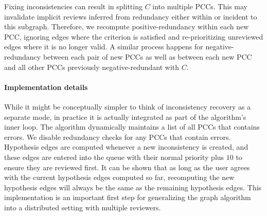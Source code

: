 Fixing inconsistencies can result in splitting $C$ into multiple PCCs.
This may invalidate implicit reviews inferred from redundancy either within or incident to this subgraph.
Therefore, we recompute positive-redundancy within each new PCC, ignoring edges where the criterion is satisfied
  and re-prioritizing unreviewed edges where it is no longer valid.
A similar process happens for negative-redundancy between each pair of new PCCs as well as between each new PCC
  and all other PCCs previously negative-redundant with $C$.

\paragraph{Implementation details}
While it might be conceptually simpler to think of inconsistency recovery as a separate mode, in practice it is
  actually integrated as part of the algorithm's inner loop.
The algorithm dynamically maintains a list of all PCCs that contains errors.
We disable redundancy checks for any PCCs that contain errors.
Hypothesis edges are computed whenever a new inconsistency is created, and these edges are entered into the queue
  with their normal priority plus $10$ to ensure they are reviewed first.
It can be shown that as long as the user agrees with the current hypothesis edges computed so far, recomputing
  the new hypothesis edges will always be the same as the remaining hypothesis edges.
This implementation is an important first step for generalizing the graph algorithm into a distributed setting
  with multiple reviewers.







